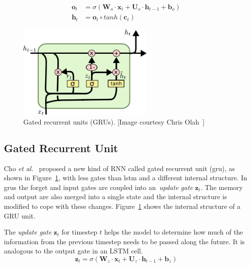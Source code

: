 \begin{equation}\label{eq:LSTM_output_gate}
\begin{split}
\mathbf{o}_t &= \sigma\left(\mathbf{W}_o \cdot \mathbf{x}_t + \mathbf{U}_o \cdot \mathbf{h}_{t-1} + \mathbf{b}_o \right)\\
\mathbf{h}_t &= \mathbf{o}_t \circ tanh \left(\mathbf{c}_t\right)
\end{split}
\end{equation}


\begin{figure}
	\centering
	\includegraphics[width=0.6\textwidth]{figures/GRU.pdf}
	\caption[Gated Recurrent Units (GRUs)]
	{Gated recurrent units (GRUs). [Image courtesy Chris Olah~\cite{colah_15}]\label{fig:GRU}}
\end{figure}

\subsection{Gated Recurrent Unit}\label{sec:GRU}
Cho \textit{et al.}~\cite{Cho_14} proposed a new kind of RNN called gated recurrent unit (\gls{gru}), as shown in Figure~\ref{fig:GRU}, with less gates than \gls{lstm} and a different internal structure. In \gls{gru}s the forget and input gates are coupled into an~\emph{update gate} $\mathbf{z}_t$.  The memory and output are also merged into a single state and the internal structure is modified to cope with these changes. Figure~\ref{fig:GRU} shows the internal structure of a GRU unit.

The \textit{update gate} $\mathbf{z}_t$ for timestep $t$ helps the model to determine how much of the information from the previous timestep needs to be passed along the future.  It is analogous to the output gate in an LSTM cell.
\begin{equation}
\mathbf{z}_t = \sigma \left(\mathbf{W}_z \cdot \mathbf{x}_t + \mathbf{U}_z \cdot \mathbf{h}_{t-1} + \mathbf{b}_z\right)
\end{equation}

